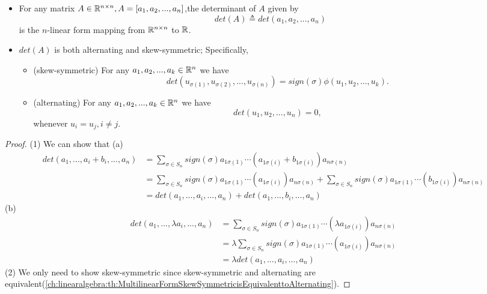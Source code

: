 \begin{refsection}
\begin{lemma}\hfill\label{ch:linearalgebra:th:DeterminantAndMultilinearForm}
\begin{itemize}
	\item For any matrix $A\in \mathbb{R}^{n\times n}, A = [a_1,a_2,...,a_n]$,the determinant of $A$ given by $$det(A) \triangleq det(a_1,a_2,...,a_n)$$
	is the $n$-linear form mapping from $\mathbb{R}^{n\times n}$ to $\mathbb{R}$.
	\item $det(A)$ is both alternating and skew-symmetric; Specifically, 
	\begin{itemize}
		\item (skew-symmetric) For any $a_1,a_2,...,a_k\in \mathbb{R}^n$ we have
		$$det(u_{\sigma(1)},u_{\sigma(2)},...,u_{\sigma(n)}) = sign(\sigma)\phi(u_{1},u_{2},...,u_{k}).$$
		\item (alternating) For any $a_1,a_2,...,a_k\in \mathbb{R}^n$ we have
		$$det(u_{1},u_{2},...,u_{n}) = 0,$$
		whenever $u_i=u_j,i\neq j.$	
	\end{itemize}
\end{itemize}	
\end{lemma}
\begin{proof}
(1)	
We can show that
(a)
\begin{align*}
det(a_1,...,a_i+b_i,...,a_n) &= \sum_{\sigma \in S_n} sign(\sigma)a_{1\sigma(1)}\cdots (a_{1\sigma(i)}+b_{1\sigma(i)})a_{n\sigma(n)} \\
&= \sum_{\sigma \in S_n} sign(\sigma)a_{1\sigma(1)}\cdots (a_{1\sigma(i)})a_{n\sigma(n)} + \sum_{\sigma \in S_n} sign(\sigma)a_{1\sigma(1)}\cdots (b_{1\sigma(i)})a_{n\sigma(n)} \\
&= det(a_1,...,a_i,...,a_n)+det(a_1,...,b_i,...,a_n)
\end{align*}
(b)\begin{align*}
det(a_1,...,\lambda a_i,...,a_n) &= \sum_{\sigma \in S_n} sign(\sigma)a_{1\sigma(1)}\cdots (\lambda a_{1\sigma(i)})a_{n\sigma(n)} \\
&= \lambda \sum_{\sigma \in S_n} sign(\sigma)a_{1\sigma(1)}\cdots (a_{1\sigma(i)})a_{n\sigma(n)}  \\
&= \lambda det(a_1,...,a_i,...,a_n)
\end{align*}
(2) We only need to show skew-symmetric since skew-symmetric and alternating are equivalent(\autoref{ch:linearalgebra:th:MultilinearFormSkewSymmetricisEquivalenttoAlternating}).
\end{proof}




\end{refsection}
